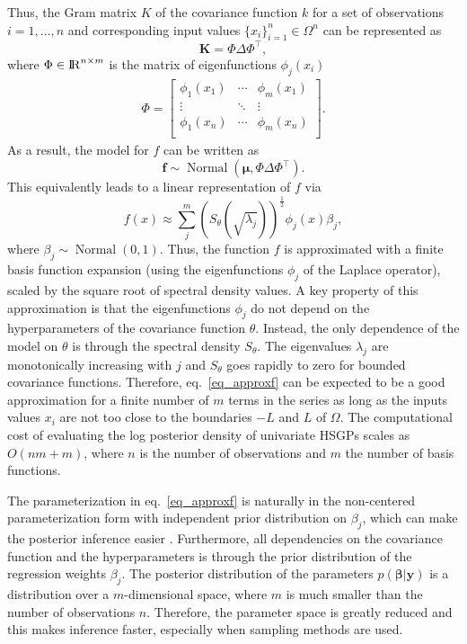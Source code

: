 \documentclass[onecolumn,a4paper,11pt]{article}
\DeclareMathOperator{\Normal}{Normal}
\begin{document}
Thus, the Gram matrix $K$ of the covariance function $k$ for a set of observations $i=1,\ldots,n$ and corresponding input values $\{x_i\}_{i=1}^{n} \in \Omega^{n}$ can be represented as
%
\begin{equation}
 \bm{K} = \Phi \Delta \Phi^\intercal, \nonumber
\end{equation}
%
where $\Phi \in {\rm I\!R}^{n\times m}$ is the matrix of eigenfunctions $\phi_j(x_i)$
%
\begin{align}
\Phi =  \left[ {\begin{array}{ccc}
   \phi_1(x_1) & \cdots & \phi_m(x_1)  \\
    \vdots &\ddots & \vdots  \nonumber \\ 
    \phi_1(x_n) & \cdots & \phi_m(x_n) \\
  \end{array} } \right].
\end{align}
As a result, the model for $f$ can be written as
%
\begin{equation}
\bm{f} \sim \Normal(\bm{\mu},\Phi \Delta \Phi^\intercal). \nonumber
\end{equation}
This equivalently leads to a linear representation of $f$ via
%
\begin{equation}\label{eq_approxf}
f(x) \approx \sum_{j}^m \left( S_{\theta}(\sqrt{\lambda_j})\right)^{\frac{1}{2}} \phi_j(x) \beta_j,
\end{equation}
%
where $\beta_j \sim \Normal(0,1)$. Thus, the function $f$ is approximated with a finite basis function expansion (using the eigenfunctions $\phi_j$ of the Laplace operator), scaled by the square root of spectral density values. A key property of this approximation is that the eigenfunctions $\phi_j$ do not depend on the hyperparameters of the covariance function $\theta$. Instead, the only dependence of the model on $\theta$ is through the spectral density $S_{\theta}$. The eigenvalues $\lambda_j$ are monotonically increasing with $j$ and $S_{\theta}$ goes rapidly to zero for bounded covariance functions. Therefore, eq.~\eqref{eq_approxf} can be expected to be a good approximation for a finite number of $m$ terms in the series as long as the inputs values $x_i$ are not too close to the boundaries $-L$ and $L$ of $\Omega$. The computational cost of evaluating the log posterior density of univariate HSGPs scales as $O(nm + m)$, where $n$ is the number of observations and $m$ the number of basis functions.

The parameterization in eq.~\eqref{eq_approxf} is naturally in the non-centered parameterization form with independent prior distribution on $\beta_j$, which can make the posterior inference easier \citep[see, e.g., ][]{Betancourt+Girolami:2019}. Furthermore, all dependencies on the covariance function and the hyperparameters is through the prior distribution of the regression weights $\beta_j$. The posterior distribution of the parameters $p(\bm{\beta}|\bm{y})$ is a distribution over a $m$-dimensional space, where $m$ is much smaller than the number of observations $n$. Therefore, the parameter space is greatly reduced and this makes inference faster, especially when sampling methods are used.
\end{document}
